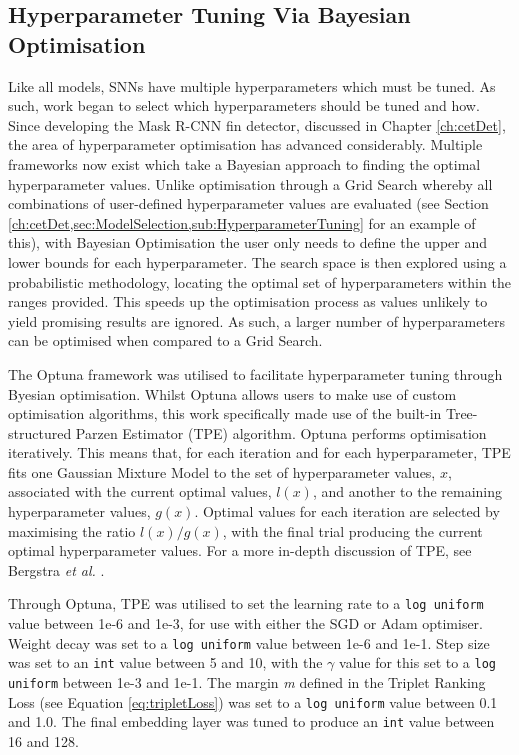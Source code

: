 \subsection{Hyperparameter Tuning Via Bayesian Optimisation }\label{ch:ID,sec:SNNDevelopment,sub:Optuna}

Like all models, SNNs have multiple hyperparameters which must be tuned. As such, work began to select which hyperparameters should be tuned and how. Since developing the Mask R-CNN fin detector, discussed in Chapter \ref{ch:cetDet}, the area of hyperparameter optimisation has advanced considerably. Multiple frameworks now exist which take a Bayesian approach to finding the optimal hyperparameter values. Unlike optimisation through a Grid Search whereby all combinations of user-defined hyperparameter values are evaluated (see Section \ref{ch:cetDet,sec:ModelSelection,sub:HyperparameterTuning} for an example of this), with Bayesian Optimisation the user only needs to define the upper and lower bounds for each hyperparameter. The search space is then explored using a probabilistic methodology, locating the optimal set of hyperparameters within the ranges provided. This speeds up the optimisation process as values unlikely to yield promising results are ignored. As such, a larger number of hyperparameters can be optimised when compared to a Grid Search. 

The Optuna framework \cite{akiba_optuna_2019}  was utilised to facilitate hyperparameter tuning through Byesian optimisation. Whilst Optuna allows users to make use of custom optimisation algorithms, this work specifically made use of the built-in Tree-structured Parzen Estimator (TPE) algorithm. Optuna performs optimisation iteratively. This means that, for each iteration and for each hyperparameter, TPE fits one Gaussian Mixture Model to the set of hyperparameter values, $x$, associated with the current optimal values, $l(x)$, and another to the remaining hyperparameter values, $g(x)$. Optimal values for each iteration are selected by maximising the ratio $l(x)/g(x)$, with the final trial producing the current optimal hyperparameter values. For a more in-depth discussion of TPE, see Bergstra \textit{et al.} \cite{bergstra_algorithms_2011}.

Through Optuna, TPE was utilised to set the learning rate to a \texttt{log uniform} value between 1e-6 and 1e-3, for use with either the SGD or Adam optimiser.  Weight decay was set to a \texttt{log uniform} value between 1e-6 and 1e-1. Step size was set to an \texttt{int} value between 5 and 10, with the $\gamma$ value for this set to a \texttt{log uniform} between 1e-3 and 1e-1. The margin \textit{m} defined in the Triplet Ranking Loss (see Equation \ref{eq:tripletLoss}) was set to a \texttt{log uniform} value between 0.1 and 1.0. The final embedding layer was tuned to produce an \texttt{int} value between 16 and 128.

